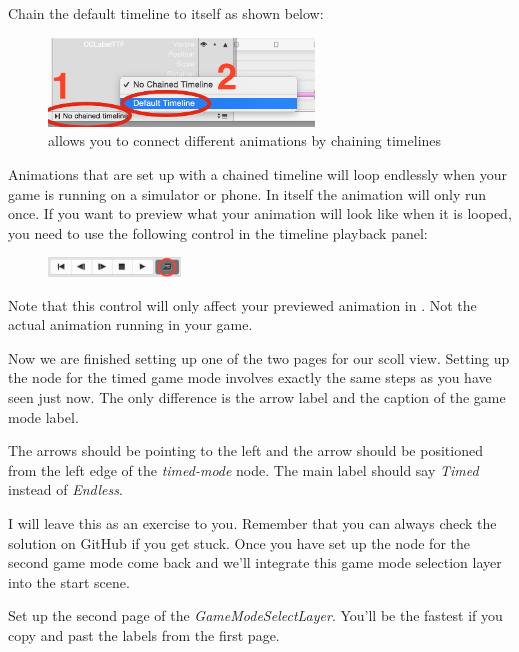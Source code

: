 \begin{leftbar}
Chain the default timeline to itself as shown below:
\begin{figure}[H]
\centering
\includegraphics[width=200pt]{images/Chapter7/chain_timeline_2.png}
\caption{\SB{} allows you to connect different animations by chaining
timelines}
\end{figure}
\end{leftbar}

\begin{details}
Animations that are set up with a chained timeline will loop endlessly when your
game is running on a simulator or phone. In \SB{} itself the animation will only
run once. If you want to preview what your animation will look like when it is
looped, you need to use the following control in the timeline playback panel:
\begin{figure}[H]
\centering
\includegraphics[width=100pt]{images/Chapter7/loop_timeline.png}
\end{figure}
Note that this control will only affect your previewed animation in \SB{}. Not
the actual animation running in your game.
\end{details}

Now we are finished setting up one of the two pages for our scoll view. Setting
up the node for the timed game mode involves exactly the same steps as you have seen just
now. The only difference is the arrow label and the caption of the game mode
label.

The arrows should be pointing to the left and the arrow should be positioned from the left edge of the
\textit{timed-mode} node. The main label should say \textit{Timed}
instead of \textit{Endless}. 

I will leave this as an exercise to you. Remember that you can always check the
solution on GitHub if you get stuck.%
Once you have set up the node for the second game mode come back and we'll
integrate this game mode selection layer into the start scene.

\begin{leftbar}
Set up the second page of the \textit{GameModeSelectLayer}. You'll be the
fastest if you copy and past the labels from the first page.
\end{leftbar}

